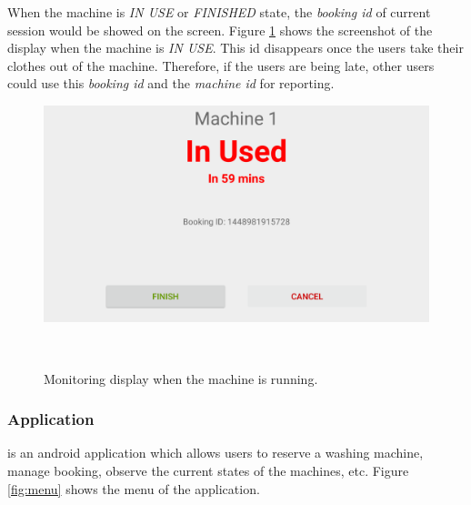 When the machine is \emph{IN USE} or \emph{FINISHED} state, the \emph{booking id} of current session would be showed on the screen. Figure \ref{fig:figure3} shows the screenshot of the display when the machine is \emph{IN USE}. This id disappears once the users take their clothes out of the machine. Therefore, if the users are being late, other users could use this \emph{booking id} and the \emph{machine id} for reporting.
\begin{figure}[h]
\centering
  \includegraphics[width=0.8\columnwidth]{figures/inuse}
  \caption{Monitoring display when the machine is running.}~\label{fig:figure3}
\end{figure}
\subsubsection{{\toolname} Application}
{\toolname} is an android application which allows users to reserve a washing machine, manage booking, observe the current states of the machines, etc. Figure \ref{fig:menu} shows the menu of the application.

